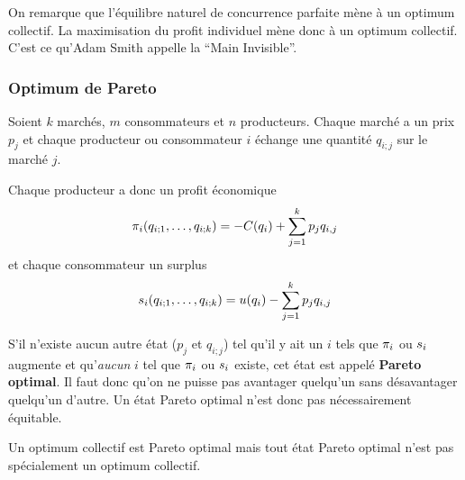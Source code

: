 On remarque que l'équilibre naturel de concurrence parfaite mène à
un optimum collectif.
La maximisation du profit individuel mène donc à un optimum collectif.
C'est ce qu'Adam Smith appelle la ``Main Invisible''.

\subsubsection{Optimum de Pareto}
Soient $k$ marchés, $m$ consommateurs et $n$ producteurs.
Chaque marché a un prix $p_j$ et chaque producteur ou consommateur $i$
échange une quantité $q_{i;j}$ sur le marché $j$.

Chaque producteur a donc un profit économique
\[ \pi_i(q_{i;1},\ldots,q_{i;k}) = -C(q_i) + \sum_{j=1}^k p_jq_{i,j} \]
et chaque consommateur un surplus
\[ s_i(q_{i;1},\ldots,q_{i;k}) = u(q_i) - \sum_{j=1}^k p_jq_{i,j} \]

S'il n'existe aucun autre état ($p_j$ et $q_{i;j}$)
tel qu'il y ait un $i$ tels que $\pi_i$ ou $s_i$ augmente et
qu'\emph{aucun} $i$ tel que $\pi_i$ ou $s_i$ existe,
cet état est appelé \textbf{Pareto optimal}.
Il faut donc qu'on ne puisse pas avantager quelqu'un sans désavantager
quelqu'un d'autre.
Un état Pareto optimal n'est donc pas nécessairement équitable.

Un optimum collectif est Pareto optimal mais tout état Pareto optimal
n'est pas spécialement un optimum collectif.

